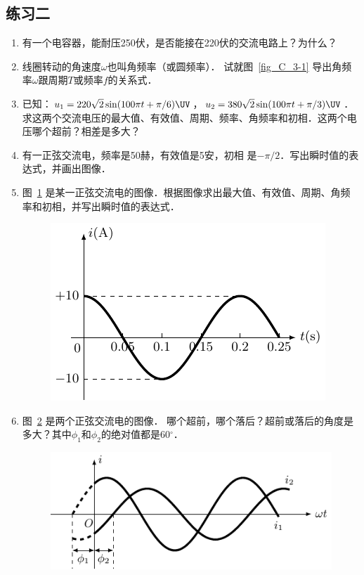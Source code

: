 \subsection*{练习二}
\begin{enumerate}
    \item 有一个电容器，能耐压250伏，是否能接在220伏的交流电路上？为什么？
    \item 线圈转动的角速度$\omega$也叫角频率（或圆频率）．
    试就图~\ref{fig_C_3-1} 导出角频率$\omega$跟周期$T$或频率$f$的关系式．
    \item 已知：$u_1=220\sqrt{2}\sin(100\pi t+\pi /6) \UV $，$u_2=380\sqrt{2}\sin(100\pi t+\pi /3) \UV $．
    求这两个交流电压的最大值、有效值、周期、频率、角频率和初相．这两个电压哪个超前？相差是多大？
    \item 有一正弦交流电，频率是50赫，有效值是5安，初相
    是$-\pi/2$．写出瞬时值的表达式，并画出图像．
    \item 图~\ref{fig_C_3-9} 是某一正弦交流电的图像．根据图像求出最大值、有效值、周期、角频率和初相，并写出瞬时值的表达式．
    \begin{figure}[htbp]
        \centering
        \includegraphics{fig/C/3-9.pdf}
        \caption{}\label{fig_C_3-9}
    \end{figure}
    \item 图~\ref{fig_C_3-10} 是两个正弦交流电的图像．
    哪个超前，哪个落后？超前或落后的角度是多大？其中$\phi_1$和$\phi_2$的绝对值都是60$^\circ$．
    \begin{figure}[htbp]
        \centering
        \includegraphics{fig/C/3-10.pdf}
        \caption{}\label{fig_C_3-10}
    \end{figure}
    
\end{enumerate}

